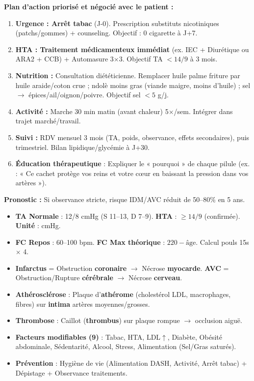 \documentclass[11pt]{article}
\newcounter{popsec}
\newcounter{popsub}
\newcommand{\courssub}[1]{%
  \stepcounter{popsub}%
  \par\vspace{9pt}\noindent{\popxbold\fontsize{11.5}{13}\selectfont\color{popink}{\color{poporange}\thepopsec.\thepopsub}\hspace{6pt}#1}\par\nopagebreak\vspace{4pt}
}
\begin{document}
\begin{exoresolu}
\tcblower
\textbf{Plan d'action priorisé et négocié avec le patient :}
\begin{enumerate}
\item \textbf{Urgence : Arrêt tabac} (J-0). Prescription substituts nicotiniques (patchs/gommes) + counseling. Objectif : 0 cigarette à J+7.
\item \textbf{HTA : Traitement médicamenteux immédiat} (ex. IEC + Diurétique ou ARA2 + CCB) + Automasure 3$\times$3. Objectif TA $< 14/9$ à 3 mois.
\item \textbf{Nutrition :} Consultation diététicienne. Remplacer huile palme friture par huile araide/coton crue ; ndolè moins gras (viande maigre, moins d'huile) ; sel $\rightarrow$ épices/ail/oignon/poivre. Objectif sel $< 5$ g/j.
\item \textbf{Activité :} Marche 30 min matin (avant chaleur) 5$\times$/sem. Intégrer dans trajet marché/travail.
\item \textbf{Suivi :} RDV mensuel 3 mois (TA, poids, observance, effets secondaires), puis trimestriel. Bilan lipidique/glycémie à J+30.
\item \textbf{Éducation thérapeutique} : Expliquer le « pourquoi » de chaque pilule (ex. : « Ce cachet protège vos reins et votre cœur en baissant la pression dans vos artères »).
\end{enumerate}
\textbf{Pronostic :} Si observance stricte, risque IDM/AVC réduit de 50--80\% en 5 ans.
\end{exoresolu}

\courssub{Synthèse et évaluation des acquis}

\begin{aretenir}
\begin{itemize}
\item \textbf{TA Normale} : 12/8 cmHg (S 11--13, D 7--9). \textbf{HTA} : $\geq 14/9$ (confirmée). \textbf{Unité} : cmHg.
\item \textbf{FC Repos} : 60--100 bpm. \textbf{FC Max théorique} : $220 - \text{âge}$. Calcul pouls 15s $\times$ 4.
\item \textbf{Infarctus} = Obstruction \textbf{coronaire} $\rightarrow$ Nécrose \textbf{myocarde}. \textbf{AVC} = Obstruction/Rupture \textbf{cérébrale} $\rightarrow$ Nécrose \textbf{cerveau}.
\item \textbf{Athérosclérose} : Plaque d'\textbf{athérome} (cholestérol LDL, macrophages, fibres) sur \textbf{intima} artères moyennes/grosses.
\item \textbf{Thrombose} : Caillot (\textbf{thrombus}) sur plaque rompue $\rightarrow$ occlusion aiguë.
\item \textbf{Facteurs modifiables (9)} : Tabac, HTA, LDL$\uparrow$, Diabète, Obésité abdominale, Sédentarité, Alcool, Stress, Alimentation (Sel/Gras saturés).
\item \textbf{Prévention} : Hygiène de vie (Alimentation DASH, Activité, Arrêt tabac) + Dépistage + Observance traitements.
\end{itemize}
\end{aretenir}
\end{document}
